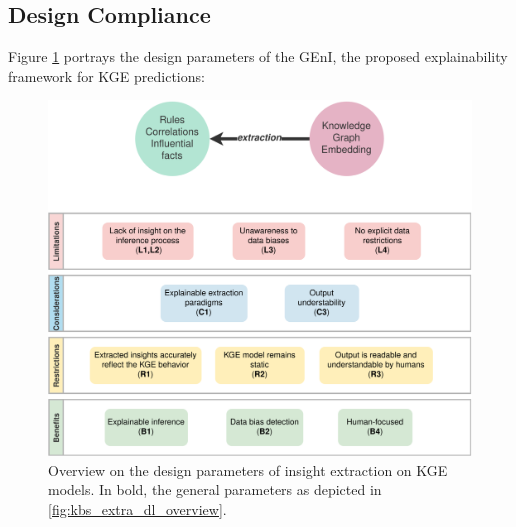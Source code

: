 \subsection{Design Compliance}\label{6_sec:subsec:geni_design_compliance}
Figure \ref{fig:design_compliance_geni} portrays the design parameters of the GEnI, the proposed explainability framework for KGE predictions: 
\begin{figure}[t]
    \centering
    \includegraphics[width=\linewidth]{6_kbsextractiondl/figures/Instance_GENI_extraction_DL.eps}
    \caption{Overview on the design parameters of insight extraction on KGE models. In bold, the general parameters as depicted in \ref{fig:kbs_extra_dl_overview}.}
    \label{fig:design_compliance_geni}
\end{figure}


